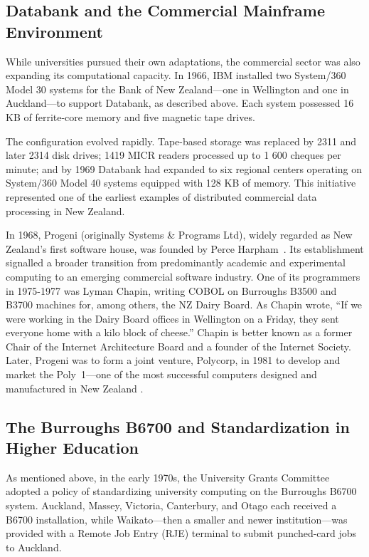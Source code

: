 \documentclass{IEEEcsmag}
\begin{document}
\subsection{Databank and the Commercial Mainframe Environment}
\vspace*{5pt}
While universities pursued their own adaptations, the commercial sector was also expanding its computational capacity. In 1966, IBM installed two System/360 Model 30 systems for the Bank of New Zealand—one in Wellington and one in Auckland—to support Databank, as described above. Each system possessed 16 KB of ferrite-core memory and five magnetic tape drives.

The configuration evolved rapidly. Tape-based storage was replaced by 2311 and later 2314 disk drives; 1419 MICR readers processed up to 1 600 cheques per minute; and by 1969 Databank had expanded to six regional centers operating on System/360 Model 40 systems equipped with 128 KB of memory. This initiative represented one of the earliest examples of distributed commercial data processing in New Zealand.

In 1968, Progeni (originally Systems \& Programs Ltd), widely regarded as New Zealand’s first software house, was founded by Perce Harpham~\cite{Harpham2010}. Its establishment signalled a broader transition from predominantly academic and experimental computing to an emerging commercial software industry. One of its programmers in 1975-1977 was Lyman Chapin, writing COBOL on Burroughs B3500 and B3700 machines for, among others, the NZ Dairy Board. As Chapin wrote, “If we were working in the Dairy Board offices in Wellington on a Friday, they sent everyone home with a kilo block of cheese.” Chapin is better known as a former Chair of the Internet Architecture Board and a founder of the Internet Society. Later, Progeni was to form a joint venture, Polycorp, in 1981 to develop and market the Poly~1—one of the most successful computers designed and manufactured in New Zealand \cite{heritage-18}.

\subsection{The Burroughs B6700 and Standardization in Higher Education}
\vspace*{5pt}
As mentioned above, in the early 1970s, the University Grants Committee adopted a policy of standardizing university computing on the Burroughs B6700 system. Auckland, Massey, Victoria, Canterbury, and Otago each received a B6700 installation, while Waikato—then a smaller and newer institution—was provided with a Remote Job Entry (RJE) terminal to submit punched-card jobs to Auckland.
\end{document}
